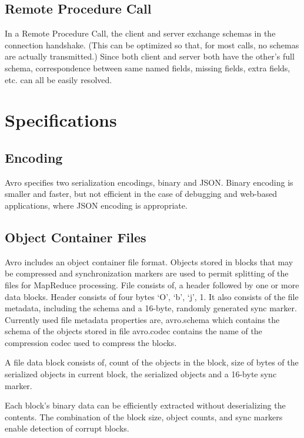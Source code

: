 \documentclass[9pt,twocolumn,twoside]{../../styles/osajnl}
\begin{document}
\subsection{Remote Procedure Call}

In a Remote Procedure Call, the client and server exchange schemas in
the connection handshake. (This can be optimized so that, for most
calls, no schemas are actually transmitted.) Since both client and
server both have the other's full schema, correspondence between same
named fields, missing fields, extra fields, etc. can all be easily
resolved\cite{www-avro-rpc}.

\section{Specifications}
\subsection{Encoding}

Avro specifies two serialization encodings, binary and JSON. Binary
encoding is smaller and faster, but not efficient in the case of
debugging and web-based applications, where JSON encoding is
appropriate\cite{www-avro-encoding}.

\subsection{Object Container Files}

Avro includes an object container file format. Objects stored in
blocks that may be compressed and synchronization markers are used to
permit splitting of the files for MapReduce processing.  File consists
of, a header followed by one or more data blocks.  Header consists of
four bytes ‘O’, ‘b’, ‘j’, 1. It also consists of the file metadata,
including the schema and a 16-byte, randomly generated sync
marker\cite{www-wiki-avro}. Currently used file metadata properties
are, avro.schema which contains the schema of the objects stored in
file avro.codec contains the name of the compression codec used to
compress the blocks.

A file data block consists of, count of the objects in the block, size
of bytes of the serialized objects in current block, the serialized
objects and a 16-byte sync marker\cite{www-wiki-avro}.

Each block’s binary data can be efficiently extracted without
deserializing the contents. The combination of the block size, object
counts, and sync markers enable detection of corrupt blocks.
\end{document}
